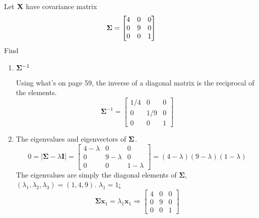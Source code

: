         Let $\bold{X}$ have covariance matrix
        \[
            \bold{\Sigma}
            =
            \begin{bmatrix}
                4 & 0 & 0\\
                0 & 9 & 0\\
                0 & 0 & 1
            \end{bmatrix}
        \]
        Find
        \begin{enumerate}[label=(\alph*)]
            \item $\bold{\Sigma}^{-1}$
            \par
            Using what's on page 59, the inverse of a diagonal matrix is the reciprocal of the elements.
            \[
                \mathbf{\Sigma}^{-1}
                =
                \begin{bmatrix}
                    1/4 & 0 & 0 \\
                    0 & 1/9 & 0 \\
                    0 & 0 & 1
                \end{bmatrix}
            \]
            \item The eigenvalues and eigenvectors of $\bold{\Sigma}$.
            \[
                 0 = \left|\mathbf{\Sigma} - \lambda\mathbf{I}\right|
                 =
                 \begin{bmatrix}
                    4-\lambda & 0 & 0 \\
                    0 & 9-\lambda & 0 \\
                    0 & 0 & 1-\lambda
                 \end{bmatrix}
                 =
                 \left(4-\lambda\right)\left(9-\lambda\right)\left(1-\lambda\right)
            \]
            The eigenvalues are simply the diagonal elements of $\mathbf{\Sigma}$, $\left(\lambda_1, \lambda_2, \lambda_3\right) = \left(1,4,9\right)$.
            \newline
            \underline{$\lambda_1 = 1$:}
            \[
                \mathbf{\Sigma}\mathbf{x}_1 = \lambda_1\mathbf{x}_1
                \Rightarrow
                \begin{bmatrix}
                    4 & 0 & 0\\
                    0 & 9 & 0\\
                    0 & 0 & 1

\end{bmatrix}\]
\end{enumerate}
